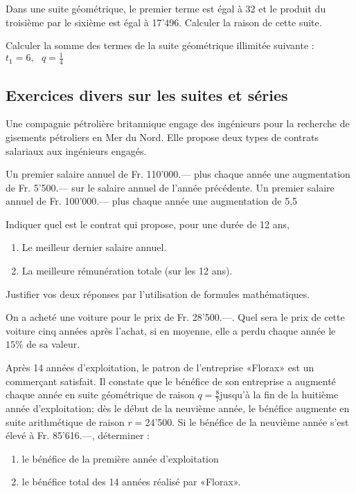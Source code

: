 \begin{exercice}
Dans une suite géométrique, le premier terme est égal à 32 et le produit du troisième par le sixième est égal à 17'496. Calculer la raison de cette suite.
\end{exercice}

\begin{exercice}
Calculer la somme des termes de la suite géométrique illimitée suivante : ${{t}_{1}}=6,\text{ }q=\frac{1}{4}$
\end{exercice}

\subsection{Exercices divers sur les suites et séries}

\begin{exercice}
Une compagnie pétrolière britannique engage des ingénieurs pour la recherche de gisements pétroliers en Mer du Nord. Elle propose deux types de contrats salariaux aux ingénieurs engagés.
\end{exercice}

\begin{exercice}
Un premier salaire annuel de Fr. 110'000.— plus chaque année une augmentation de Fr. 5’500.— sur le salaire annuel de l’année précédente.
Un premier salaire annuel de Fr. 100'000.— plus chaque année une augmentation de 5,5%

Indiquer quel est le contrat qui propose, pour une durée de 12 ans, 
\begin{enumerate}
\item Le meilleur dernier salaire annuel.
\item La meilleure rémunération totale (sur les 12 ans).
\end{enumerate}

Justifier vos deux réponses par l’utilisation de formules mathématiques.
\end{exercice}

\begin{exercice}
On a acheté une voiture pour le prix de Fr. 28'500.––. Quel sera le prix de cette voiture cinq années après l'achat, si en moyenne, elle a perdu chaque année le $15 \%$ de sa valeur.
\end{exercice}

\begin{exercice}
Après 14 années d’exploitation, le patron de l’entreprise «Florax» est un commerçant satisfait. Il constate que le bénéfice de son entreprise a augmenté chaque année en  suite géométrique de raison  $q=\tfrac{8}{7}$jusqu’à la fin de la huitième année d’exploitation; dès le début de la neuvième année, le bénéfice augmente en suite arithmétique de raison $r=$24'500.
	Si le bénéfice de la neuvième année s’est élevé à Fr. 85'616.—, déterminer : 
\begin{enumerate}
\item le bénéfice de la première année d’exploitation
\item le bénéfice total des 14 années réalisé par «Florax».
\end{enumerate}
\end{exercice}

